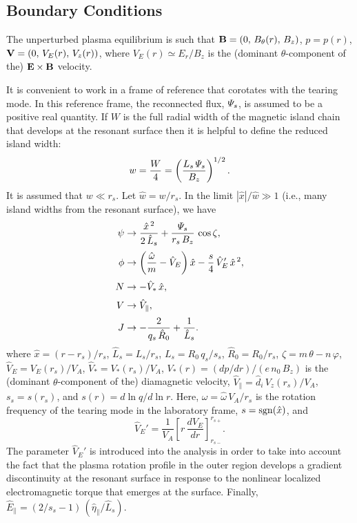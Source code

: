 \documentclass[12pt,prb,aps]{revtex4-1}
\begin{document}
\subsection{Boundary Conditions}
The unperturbed plasma equilibrium is such that
${\bf B} = (0,\,B_\theta(r),\,B_z)$,  $p = p(r)$,
${\bf V} = (0,\,V_E(r),\,V_z(r))$,
where 
$V_E(r)\simeq E_r/B_z$
 is the (dominant $\theta$-component of the) ${\bf E}\times {\bf B}$ velocity. 
 
It is convenient  to work in a frame of reference that corotates with the tearing mode. In this reference frame, the
reconnected flux, ${\mit\Psi}_s$, is assumed to be a positive real
quantity. If $W$ is the full radial width of the magnetic island chain that develops at the resonant surface then it is
helpful to define the reduced island width:
\begin{equation}\label{e26a}
w = \frac{W}{4}= \left(\frac{L_s\,{\mit\Psi}_s}{B_z}\right)^{1/2}.
\end{equation}
It is assumed that $w\ll r_s$. Let $\hat{w}=w/r_s$. 
 In the limit $|\hat{x}|/\hat{w}\gg 1$ (i.e., many island widths from the resonant surface), we have  
\begin{align}\label{e26}
\psi &\rightarrow \frac{\hat{x}^{\,2}}{2\,\hat{L}_s} + \frac{{\mit\Psi}_s}{r_s\,B_z}\,\cos\zeta,\\[0.5ex]
\phi &\rightarrow \left(\frac{\hat{\omega}}{m}- \hat{V}_E\right)\hat{x} - \frac{s}{4}\,\hat{V}_E'\,\hat{x}^{\,2},\\[0.5ex]
N &\rightarrow -\hat{V}_\ast\,\hat{x},\\[0.5ex]
V&\rightarrow \hat{V}_\parallel,\\[0.5ex]
J& \rightarrow -\frac{2}{q_s\,\hat{R}_0} + \frac{1}{\hat{L}_s}.\label{e30}
\end{align}
where 
$\hat{x}=(r-r_s)/r_s$,
 $\hat{L}_s=L_s/r_s$,  $L_s=R_0\,q_s/s_s$, $\hat{R}_0=R_0/r_s$, $\zeta=m\,\theta-n\,\varphi$, 
  $\hat{V}_E= V_E(r_s)/V_A$,
$\hat{V}_\ast= V_\ast(r_s)/V_A$,
$V_\ast(r) = (dp/dr)/(e\,n_0\,B_z)$ 
is the (dominant $\theta$-component of the) diamagnetic velocity,
 $\hat{V}_\parallel=\hat{d}_i\, V_z(r_s)/V_A$, $s_s=s(r_s)$, and $s(r)=d\ln q/d\ln r$. 
Here, $\omega = \hat{\omega}\,V_A/r_s$ is the rotation frequency of the tearing mode  in the
laboratory frame,
$s = {\rm sgn}(\hat{x})$,
and 
\begin{equation}
\hat{V}_E' = \frac{1}{V_A}\left[r\,\frac{dV_E}{dr}\right]_{r_{s-}}^{r_{s+}}.
\end{equation}
The parameter $\hat{V}_E'$ is introduced  into the analysis in order to take into account the fact that the plasma rotation profile in the outer region develops a
gradient discontinuity at the resonant surface in response to the nonlinear localized electromagnetic torque that emerges 
at the surface.\cite{fw} Finally, 
 $\hat{E}_\parallel =(2/s_s-1) \,(\hat{\eta}_\parallel/\hat{L}_s)$.
 
\end{document}
